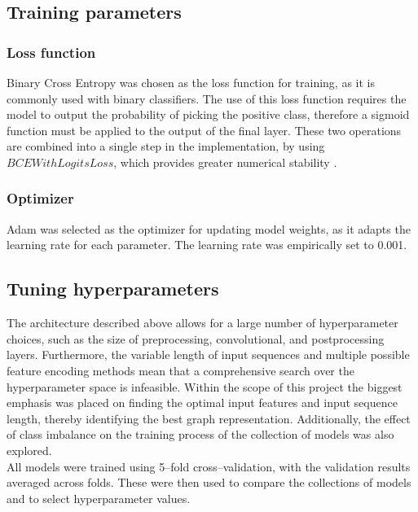 \subsection{Training parameters}

\subsubsection{Loss function}
Binary Cross Entropy was chosen as the loss function for training, as it is commonly used with binary classifiers. 
The use of this loss function requires the model to output the probability of picking the positive class, therefore a sigmoid function must be applied to the output of the final layer.
These two operations are combined into a single step in the implementation, by using  $BCEWithLogitsLoss$, which provides greater numerical stability \cite{Ansel_PyTorch_2_Faster_2024}.

\subsubsection{Optimizer}
Adam was selected as the optimizer for updating model weights, as it adapts the learning rate for each parameter. The learning rate was empirically set to 0.001.

\subsection{Tuning hyperparameters}
The architecture described above allows for a large number of hyperparameter choices, such as the size of preprocessing, convolutional, and postprocessing layers. Furthermore, the variable length of input sequences and multiple possible feature encoding methods mean that a comprehensive search over the hyperparameter space is infeasible. Within the scope of this project the biggest emphasis was placed on finding the optimal input features and input sequence length, thereby identifying the best graph representation. Additionally, the effect of class imbalance on the training process of the collection of models was also explored.\\
All models were trained using 5--fold cross--validation, with the validation results averaged across folds. These were then used to compare the collections of models and to select hyperparameter values.